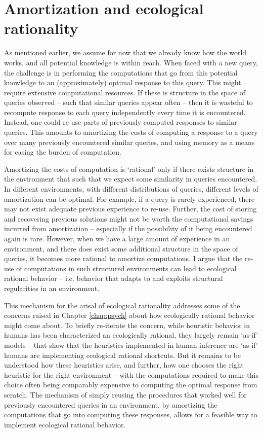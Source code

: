 \section{Amortization and ecological rationality}

As mentioned earlier, we assume for now that we already know how the world works, and all potential knowledge is within reach. When faced with a new query, the challenge is in performing the computations that go from this potential knowledge to an (approximately) optimal response to this query. This might require extensive computational resources. If these is structure in the space of queries observed -- such that similar queries appear often -- then it is wasteful to recompute response to each query independently every time it is encountered. Instead, one could re-use parts of previously computed responses to similar queries. This amounts to amortizing the costs of computing a response to a query over many previously encountered similar queries, and using memory as a means for easing the burden of computation.

Amortizing the costs of computation is `rational' only if there exists structure in the environment that such that we expect some similarity in queries encountered. In different environments, with different distributions of queries, different levels of amortization can be optimal. For example, if a query is rarely experienced, there may not exist adequate previous experience to re-use. Further, the cost of storing and recovering previous solutions might not be worth the computational savings incurred from amortization -- especially if the possibility of it being encountered again is rare. However, when we have a large amount of experience in an environment, and there does exist some additional structure in the space of queries, it becomes more rational to amortize computations. I argue that the re-use of computations in such structured environments can lead to ecological rational behavior -- i.e. behavior that adapts to and exploits structural regularities in an environment. 

This mechanism for the arisal of ecological rationality addresses some of the concerns raised in Chapter \ref{chap:psych} about how ecologically rational behavior might come about. To briefly re-iterate the concern, while heuristic behavior in humans has been characterized an ecologically rational\cite{gigerenzer2008heuristics}, they largely remain `as-if' models -- that show that the heuristics implemented in human inference are `as-if' humans are implementing ecological rational shortcuts. But it remains to be understood how these heuristics arise, and further, how one chooses the right heuristic for the right environment -- with the computations required to make this choice often being comparably expensive to computing the optimal response from scratch\cite{lieder2017strategy}. The mechanism of simply reusing the procedures that worked well for previously encountered queries in an environment, by amortizing the computations that go into computing these responses, allows for a feasible way to implement ecological rational behavior. 

